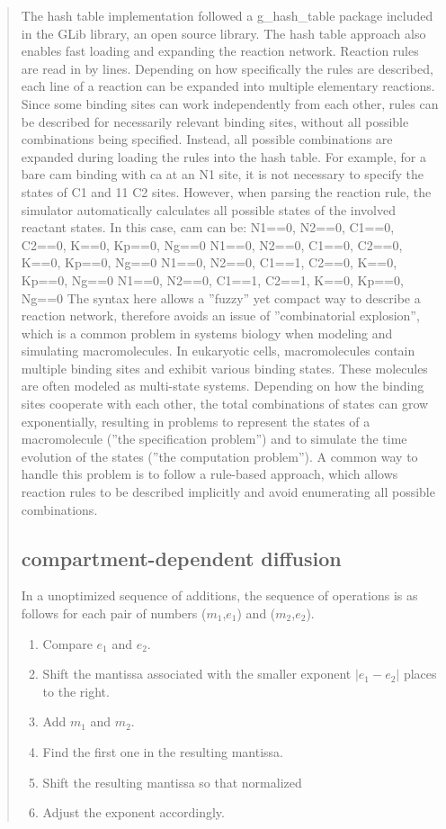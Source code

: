 \begin{quote}
The hash table implementation followed a g_hash_table package included in the GLib library, an open source library. The hash table approach also enables fast loading and expanding the reaction network. Reaction rules are read in by lines. Depending on how specifically the rules are described, each line of a reaction can be expanded into multiple elementary reactions. Since some binding sites can work independently from each other, rules can be described for necessarily relevant binding sites, without all possible combinations being specified. Instead, all possible combinations are expanded during loading the rules into the hash table. For example, for a bare cam binding with ca at an N1 site, it is not necessary to specify the states of C1 and
11
C2 sites. However, when parsing the reaction rule, the simulator automatically calculates all possible states of the involved reactant states. In this case, cam can be:
N1==0, N2==0, C1==0, C2==0, K==0, Kp==0, Ng==0
N1==0, N2==0, C1==0, C2==0, K==0, Kp==0, Ng==0
N1==0, N2==0, C1==1, C2==0, K==0, Kp==0, Ng==0
N1==0, N2==0, C1==1, C2==1, K==0, Kp==0, Ng==0
The syntax here allows a ”fuzzy” yet compact way to describe a reaction network, therefore avoids an issue of ”combinatorial explosion”, which is a common problem in systems biology when modeling and simulating macromolecules. In eukaryotic cells, macromolecules contain multiple binding sites and exhibit various binding states. These molecules are often modeled as multi-state systems. Depending on how the binding sites cooperate with each other, the total combinations of states can grow exponentially, resulting in problems to represent the states of a macromolecule (”the specification problem”) and to simulate the time evolution of the states (”the computation problem”). A common way to handle this problem is to follow a rule-based approach, which allows reaction rules to be described implicitly and avoid enumerating all possible combinations.


\subsection{compartment-dependent diffusion}









In a unoptimized sequence of additions, the sequence of operations is as
follows for each pair of numbers ($m_1$,$e_1$) and ($m_2$,$e_2$).
\begin{enumerate}
  \item Compare $e_1$ and $e_2$.
  \item Shift the mantissa associated with the smaller exponent $|e_1-e_2|$
        places to the right.
  \item Add $m_1$ and $m_2$.
  \item Find the first one in the resulting mantissa.
  \item Shift the resulting mantissa so that normalized
  \item Adjust the exponent accordingly.
\end{enumerate}


\end{quote}
